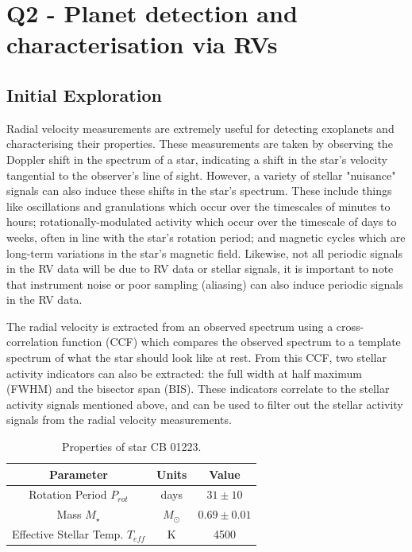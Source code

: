 
\section{Q2 - Planet detection and characterisation via RVs}\label{sec:q2}
\subsection{Initial Exploration}\label{subsec:q2-init-exploration}
Radial velocity measurements are extremely useful for detecting exoplanets and characterising their properties.
These measurements are taken by observing the Doppler shift in the spectrum of a star, indicating a shift in the star's velocity
tangential to the observer's line of sight.
However, a variety of stellar "nuisance" signals can also induce these shifts in the star's spectrum.
These include things like oscillations and granulations which occur over the timescales of minutes to hours; rotationally-modulated
activity which occur over the timescale of days to weeks, often in line with the star's rotation period; and magnetic cycles
which are long-term variations in the star's magnetic field.
Likewise, not all periodic signals in the RV data will be due to RV data or stellar signals, it is important to note
that instrument noise or poor sampling (aliasing) can also induce periodic signals in the RV data.

The radial velocity is extracted from an observed spectrum using a cross-correlation function (CCF) which compares the observed
spectrum to a template spectrum of what the star should look like at rest.
From this CCF, two stellar activity indicators can also be extracted: the full width at half maximum (FWHM) and the bisector
span (BIS).
These indicators correlate to the stellar activity signals mentioned above, and can be used to filter out the stellar
activity signals from the radial velocity measurements.

\begin{table}[htb]
    \centering
    \begin{tabular}{ccc}
        \toprule
        \toprule
        Parameter & Units & Value \\
        \midrule
        Rotation Period $P_{rot}$ & days & $31 \pm 10$ \\
        \addlinespace
        Mass $M_{\star}$ & $M_{\odot}$ & $0.69 \pm 0.01$ \\
        \addlinespace
        Effective Stellar Temp. $T_{eff}$ & K & 4500 \\
        \bottomrule
    \end{tabular}
    \caption{Properties of star CB 01223.}
    \label{tab:star_props}
\end{table}

